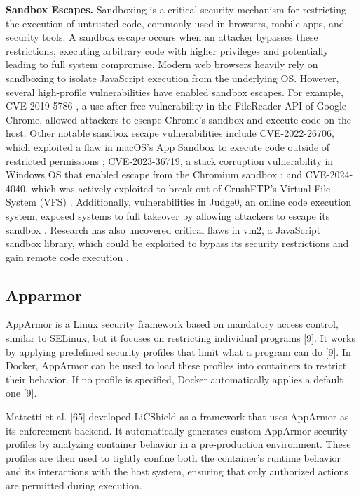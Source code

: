 \documentclass[12pt]{report}
\begin{document}
\begin{doublespace}
\noindent\textbf{Sandbox Escapes.} Sandboxing is a critical security mechanism for restricting the execution of untrusted code, commonly used in browsers, mobile apps, and security tools. A sandbox escape occurs when an attacker bypasses these restrictions, executing arbitrary code with higher privileges and potentially leading to full system compromise. Modern web browsers heavily rely on sandboxing to isolate JavaScript execution from the underlying OS. However, several high-profile vulnerabilities have enabled sandbox escapes. For example, CVE-2019-5786 \cite{chromezeroday}, a use-after-free vulnerability in the FileReader API of Google Chrome, allowed attackers to escape Chrome's sandbox and execute code on the host. Other notable sandbox escape vulnerabilities include CVE-2022-26706, which exploited a flaw in macOS's App Sandbox to execute code outside of restricted permissions \cite{macossandboxescape}; CVE-2023-36719, a stack corruption vulnerability in Windows OS that enabled escape from the Chromium sandbox \cite{chromiumsandboxescape}; and CVE-2024-4040, which was actively exploited to break out of CrushFTP’s Virtual File System (VFS) \cite{crushftpsandboxescape}. Additionally, vulnerabilities in Judge0, an online code execution system, exposed systems to full takeover by allowing attackers to escape its sandbox \cite{judge0sandboxescape}. Research has also uncovered critical flaws in vm2, a JavaScript sandbox library, which could be exploited to bypass its security restrictions and gain remote code execution \cite{vm2sandboxescape}.

\subsection{Apparmor}

AppArmor is a Linux security framework based on mandatory access control, similar to SELinux, but it focuses on restricting individual programs [9]. It works by applying predefined security profiles that limit what a program can do [9]. In Docker, AppArmor can be used to load these profiles into containers to restrict their behavior. If no profile is specified, Docker automatically applies a default one [9].

Mattetti et al. [65] developed LiCShield as a framework that uses AppArmor as its enforcement backend. It automatically generates custom AppArmor security profiles by analyzing container behavior in a pre-production environment. These profiles are then used to tightly confine both the container’s runtime behavior and its interactions with the host system, ensuring that only authorized actions are permitted during execution.


\end{doublespace}
\end{document}
